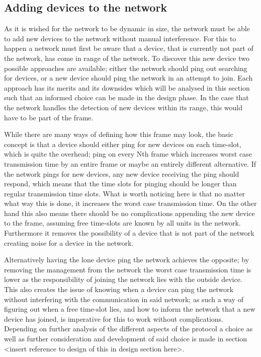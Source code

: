 \subsection{Adding devices to the network}\label{AddDev}
As it is wished for the network to be dynamic in size, the network must be able to add new devices to the network without manual interference.
For this to happen a network must first be aware that a device, that is currently not part of the network, has come in range of the network.
To discover this new device two possible approaches are available; either the network should ping out searching for devices, or a new device should ping the network in an attempt to join.
Each approach has its merits and its downsides which will be analysed in this section such that an informed choice can be made in the design phase.
In the case that the network handles the detection of new devices within its range, this would have to be part of the frame.

\bigskip
\noindent While there are many ways of defining how this frame may look, the basic concept is that a device should either ping for new devices on each time-slot, which is quite the overhead; ping on every Nth frame which increases worst case transmission time by an entire frame or maybe an entirely different alternative.
If the network pings for new devices, any new device receiving the ping should respond, which means that the time slots for pinging should be longer than regular transmission time slots.
What is worth noticing here is that no matter what way this is done, it increases the worst case transmission time.
On the other hand this also means there should be no complications appending the new device to the frame, assuming free time-slots are known by all units in the network.
Furthermore it removes the possibility of a device that is not part of the network creating noise for a device in the network.

Alternatively having the lone device ping the network achieves the opposite; by removing the management from the network the worst case transmission time is lower as the responsibility of joining the network lies with the outside device.
This also creates the issue of knowing when a device can ping the network without interfering with the communication in said network; as such a way of figuring out when a free time-slot lies, and how to inform the network that a new device has joined, is imperative for this to work without complications.
Depending on further analysis of the different aspects of the protocol a choice as well as further consideration and development of said choice is made in section <insert reference to design of this in design section here>.